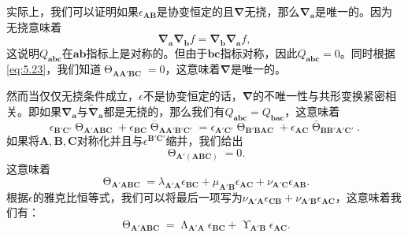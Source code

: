 实际上，我们可以证明如果$\epsilon _{\boldsymbol{AB}}$是协变恒定的且$\boldsymbol{\nabla }$无挠，那么$\boldsymbol{\nabla }_{\boldsymbol{a}}$是唯一的。因为无挠意味着
\begin{equation*}
	\boldsymbol{\nabla }_{\boldsymbol{a}}\boldsymbol{\nabla }_{\boldsymbol{b}} f=\boldsymbol{\nabla }_{\boldsymbol{b}}\boldsymbol{\nabla }_{\boldsymbol{a}} f,
\end{equation*}
这说明$Q_{\boldsymbol{abc}}$在$\boldsymbol{ab}$指标上是对称的。但由于$\boldsymbol{bc}$指标对称，因此$Q_{\boldsymbol{abc}} =0$。同时根据\ref{eq:5.23}，我们知道$\upTheta _{\boldsymbol{AA} '\boldsymbol{BC}} =0$，这意味着$\boldsymbol{\nabla }$是唯一的。



然而当仅仅无挠条件成立，$\epsilon $不是协变恒定的话，$\boldsymbol{\nabla }$的不唯一性与共形变换紧密相关。即如果$\boldsymbol{\nabla }_{\boldsymbol{a}}$与$\tilde{\boldsymbol{\nabla }}_{\boldsymbol{a}}$都是无挠的，那么我们有$Q_{\boldsymbol{abc}} =Q_{\boldsymbol{bac}}$，这意味着
\begin{equation}
	\epsilon _{\boldsymbol{B} '\boldsymbol{C} '} \upTheta _{\boldsymbol{A} '\boldsymbol{ABC}} +\epsilon _{\boldsymbol{BC}}\overline{\upTheta }_{\boldsymbol{AA} '\boldsymbol{B} '\boldsymbol{C} '} =\epsilon _{\boldsymbol{A} '\boldsymbol{C} '} \upTheta _{\boldsymbol{B} '\boldsymbol{BAC}} +\epsilon _{\boldsymbol{AC}}\overline{\upTheta }_{\boldsymbol{BB} '\boldsymbol{A} '\boldsymbol{C} '} .
	\label{eq:5.26}
\end{equation}
如果将$\boldsymbol{A} ,\boldsymbol{B,C}$对称化并且与$\epsilon ^{\boldsymbol{B} '\boldsymbol{C} '}$缩并，我们给出
\begin{equation*}
	\upTheta _{\boldsymbol{A} '(\boldsymbol{ABC})} =0.
\end{equation*}
这意味着
\begin{equation*}
	\upTheta _{\boldsymbol{A} '\boldsymbol{ABC}} =\lambda _{\boldsymbol{A} '\boldsymbol{A}} \epsilon _{\boldsymbol{BC}} +\mu _{\boldsymbol{A} '\boldsymbol{B}} \epsilon _{\boldsymbol{AC}} +\nu _{\boldsymbol{A} '\boldsymbol{C}} \epsilon _{\boldsymbol{AB}} .
\end{equation*}
根据$\epsilon $的雅克比恒等式，我们可以将最后一项写为$\nu _{\boldsymbol{A} '\boldsymbol{A}} \epsilon _{\boldsymbol{CB}} +\nu _{\boldsymbol{A} '\boldsymbol{B}} \epsilon _{\boldsymbol{AC}}$，这意味着我们有：
\begin{equation}
	\upTheta _{\boldsymbol{A} '\boldsymbol{ABC}} =\upLambda _{\boldsymbol{A} '\boldsymbol{A}} \epsilon _{\boldsymbol{BC}} +\upUpsilon _{\boldsymbol{A} '\boldsymbol{B}} \epsilon _{\boldsymbol{AC}} .
	\label{eq:5.27}
\end{equation}
